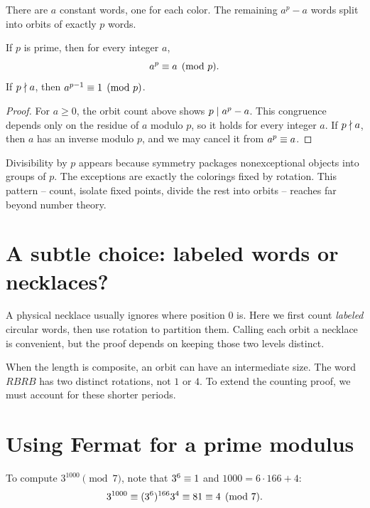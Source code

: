 There are $a$ constant words, one for each color. The remaining $a^p-a$ words split into orbits of exactly $p$ words.

\begin{theorem}
If $p$ is prime, then for every integer $a$,
\[
a^p\equiv a\pmod p.
\]
If $p\nmid a$, then $a^{p-1}\equiv1\pmod p$.
\end{theorem}

\begin{proof}
For $a\ge0$, the orbit count above shows $p\mid a^p-a$. This congruence depends only on the residue of $a$ modulo $p$, so it holds for every integer $a$. If $p\nmid a$, then $a$ has an inverse modulo $p$, and we may cancel it from $a^p\equiv a$.
\end{proof}

\begin{bigidea}
Divisibility by $p$ appears because symmetry packages nonexceptional objects into groups of $p$. The exceptions are exactly the colorings fixed by rotation. This pattern -- count, isolate fixed points, divide the rest into orbits -- reaches far beyond number theory.
\end{bigidea}

\section{A subtle choice: labeled words or necklaces?}

A physical necklace usually ignores where position $0$ is. Here we first count \emph{labeled} circular words, then use rotation to partition them. Calling each orbit a necklace is convenient, but the proof depends on keeping those two levels distinct.

\begin{warningbox}
When the length is composite, an orbit can have an intermediate size.
The word $RBRB$ has two distinct rotations, not $1$ or $4$.
To extend the counting proof, we must account for these shorter periods.
\end{warningbox}



\section{Using Fermat for a prime modulus}

To compute $3^{1000}\pmod7$, note that $3^6\equiv1$ and $1000=6\cdot166+4$:
\[
3^{1000}\equiv(3^6)^{166}3^4\equiv81\equiv4\pmod7.
\]

